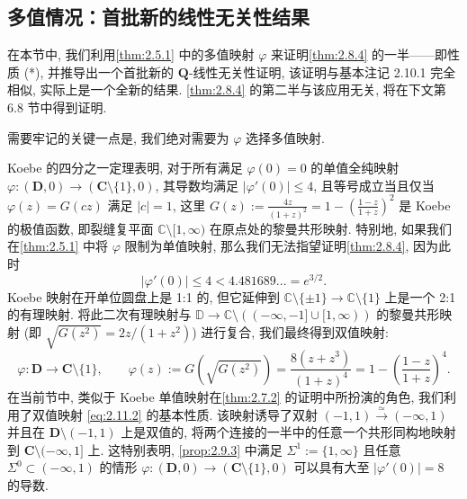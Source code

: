 \subsection{多值情况：首批新的线性无关性结果}\label{sec:2.11}

在本节中, 我们利用\autoref{thm:2.5.1} 中的多值映射 \(\varphi\) 来证明\autoref{thm:2.8.4} 的一半——即性质 (*), 并推导出一个首批新的 \(\mathbf{Q}\)-线性无关性证明, 该证明与基本注记 2.10.1 完全相似, 实际上是一个全新的结果. \autoref{thm:2.8.4} 的第二半与该应用无关, 将在下文第 6.8 节中得到证明.

需要牢记的关键一点是, 我们绝对需要为 \(\varphi\) 选择多值映射.

\begin{remark}\label{rem:2.11.1}
Koebe 的四分之一定理表明, 对于所有满足 \(\varphi(0) = 0\) 的单值全纯映射 \(\varphi: (\mathbf{D}, 0) \to (\mathbf{C} \setminus \{1\}, 0)\), 其导数均满足 \(\lvert\varphi'(0)\rvert \le 4\), 且等号成立当且仅当 \(\varphi(z) = G(cz)\) 满足 \(|c| = 1\), 
这里 \(G(z) := \frac{4z}{(1+z)^2} = 1 - \left(\frac{1-z}{1+z}\right)^2\) 是 Koebe 的极值函数, 即裂缝复平面 \(\mathbb{C} \setminus [1, \infty)\) 在原点处的黎曼共形映射.
特别地, 如果我们在\autoref{thm:2.5.1} 中将 \(\varphi\) 限制为单值映射, 那么我们无法指望证明\autoref{thm:2.8.4}, 因为此时
\[ \lvert\varphi'(0)\rvert \le 4 < 4.481689... = e^{3/2}. \]
Koebe 映射在开单位圆盘上是 1:1 的, 但它延伸到 \(\mathbb{C} \setminus \{\pm 1\} \to \mathbb{C} \setminus \{1\}\) 上是一个 2:1 的有理映射. 将此二次有理映射与 \(\mathbb{D} \to \mathbb{C} \setminus ((-\infty, -1] \cup [1, \infty))\) 的黎曼共形映射 (即 \(\sqrt{G(z^2)} = 2z/(1+z^2)\)) 进行复合, 我们最终得到双值映射:
\begin{equation}\label{eq:2.11.2}
\varphi : \mathbf{D} \to \mathbf{C} \setminus \{1\}, \qquad \varphi(z) := G\left(\sqrt{G(z^2)}\right) = \frac{8(z+z^3)}{(1+z)^4} = 1 - \left(\frac{1-z}{1+z}\right)^4.
\end{equation}
在当前节中, 类似于 Koebe 单值映射在\autoref{thm:2.7.2} 的证明中所扮演的角色, 我们利用了双值映射 \eqref{eq:2.11.2} 的基本性质. 该映射诱导了双射 \((-1,1) \stackrel{\simeq}{\longrightarrow} (-\infty,1)\) 并且在 \(\mathbf{D} \setminus (-1,1)\) 上是双值的, 将两个连接的一半中的任意一个共形同构地映射到 \(\mathbf{C} \setminus (-\infty, 1]\) 上. 这特别表明, \autoref{prop:2.9.3} 中满足 \(\Sigma^1 := \{1, \infty\}\) 且任意 \(\Sigma^0 \subset (-\infty, 1)\) 的情形 \(\varphi : (\mathbf{D}, 0) \to (\mathbf{C} \setminus \{1\}, 0)\) 可以具有大至 \(\lvert\varphi'(0)\rvert = 8\) 的导数.
\end{remark}

